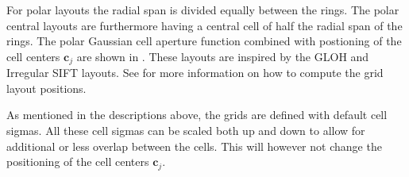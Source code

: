\documentclass[thesis.tex]{subfiles}
\def\c{\mathbf{c}}
\begin{document}
For polar layouts the radial span is divided equally between the rings. The polar central layouts are furthermore having a central cell of half the radial span of the rings. The polar Gaussian cell aperture function combined with postioning of the cell centers $\c_j$ are shown in . These layouts are inspired by the GLOH \cite{mikolajczyk2005performance} and Irregular SIFT \cite{cui2009scale} layouts.
See  for more information on how to compute the grid layout positions.

As mentioned in the descriptions above, the grids are defined with default cell sigmas. All these cell sigmas can be scaled both up and down to allow for additional or less overlap between the cells. This will however not change the positioning of the cell centers $\c_j$.
\end{document}
